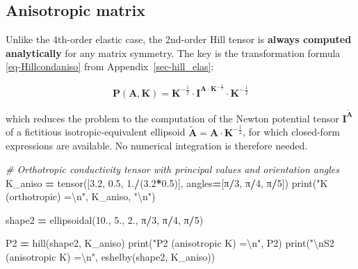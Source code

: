 \documentclass[
  a4paper,
  numbers=noendperiod,
  DIV=12]{scrreprt}
\newenvironment{Shaded}{\begin{snugshade}}{\end{snugshade}}
\newcommand{\BuiltInTok}[1]{#1}
\newcommand{\CharTok}[1]{\textcolor[rgb]{0.31,0.60,0.02}{#1}}
\newcommand{\CommentTok}[1]{\textcolor[rgb]{0.56,0.35,0.01}{\textit{#1}}}
\newcommand{\DecValTok}[1]{\textcolor[rgb]{0.00,0.00,0.81}{#1}}
\newcommand{\FloatTok}[1]{\textcolor[rgb]{0.00,0.00,0.81}{#1}}
\newcommand{\NormalTok}[1]{#1}
\newcommand{\OperatorTok}[1]{\textcolor[rgb]{0.81,0.36,0.00}{\textbf{#1}}}
\newcommand{\StringTok}[1]{\textcolor[rgb]{0.31,0.60,0.02}{#1}}
\newcommand{\uu}[1]{{\symbf{{#1}}}}
\begin{document}
\subsection{Anisotropic matrix}\label{anisotropic-matrix}

Unlike the 4th-order elastic case, the 2nd-order Hill tensor is
\textbf{always computed analytically} for any matrix symmetry. The key
is the transformation formula \ref{eq-Hillcondaniso} from
Appendix~\ref{sec-hill_elas}:

\[
\uu{P}(\uu{A},\uu{K}) = \uu{K}^{-\frac{1}{2}}\cdot\uu{I}^{\uu{A}\cdot\uu{K}^{-\frac{1}{2}}}\cdot\uu{K}^{-\frac{1}{2}}
\]

which reduces the problem to the computation of the Newton potential
tensor \(\uu{I}^{\tilde{\uu{A}}}\) of a fictitious isotropic-equivalent
ellipsoid \(\tilde{\uu{A}}=\uu{A}\cdot\uu{K}^{-\frac{1}{2}}\), for which
closed-form expressions are available. No numerical integration is
therefore needed.

\begin{Shaded}
\begin{Highlighting}[]
\CommentTok{\# Orthotropic conductivity tensor with principal values and orientation angles}
\NormalTok{K\_aniso }\OperatorTok{=}\NormalTok{ tensor([}\FloatTok{3.2}\NormalTok{, }\FloatTok{0.5}\NormalTok{, }\FloatTok{1.}\OperatorTok{/}\NormalTok{(}\FloatTok{3.2}\OperatorTok{*}\FloatTok{0.5}\NormalTok{)], angles}\OperatorTok{=}\NormalTok{[π}\OperatorTok{/}\DecValTok{3}\NormalTok{, π}\OperatorTok{/}\DecValTok{4}\NormalTok{, π}\OperatorTok{/}\DecValTok{5}\NormalTok{])}
\BuiltInTok{print}\NormalTok{(}\StringTok{"K (orthotropic) =}\CharTok{\textbackslash{}n}\StringTok{"}\NormalTok{, K\_aniso, }\StringTok{"}\CharTok{\textbackslash{}n}\StringTok{"}\NormalTok{)}

\NormalTok{shape2 }\OperatorTok{=}\NormalTok{ ellipsoidal(}\FloatTok{10.}\NormalTok{, }\FloatTok{5.}\NormalTok{, }\FloatTok{2.}\NormalTok{, π}\OperatorTok{/}\DecValTok{3}\NormalTok{, π}\OperatorTok{/}\DecValTok{4}\NormalTok{, π}\OperatorTok{/}\DecValTok{5}\NormalTok{)}

\NormalTok{P2 }\OperatorTok{=}\NormalTok{ hill(shape2, K\_aniso)}
\BuiltInTok{print}\NormalTok{(}\StringTok{"P2 (anisotropic K) =}\CharTok{\textbackslash{}n}\StringTok{"}\NormalTok{, P2)}
\BuiltInTok{print}\NormalTok{(}\StringTok{"}\CharTok{\textbackslash{}n}\StringTok{S2 (anisotropic K) =}\CharTok{\textbackslash{}n}\StringTok{"}\NormalTok{, eshelby(shape2, K\_aniso))}
\end{Highlighting}
\end{Shaded}
\end{document}
